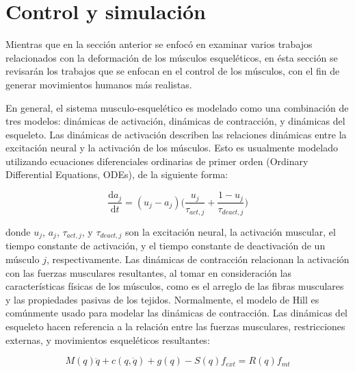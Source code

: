 \section{Control y simulación}

Mientras que en la sección anterior se enfocó en examinar varios trabajos relacionados con la deformación de los músculos esqueléticos, en ésta sección se revisarán los trabajos que se enfocan en el control de los músculos, con el fin de generar movimientos humanos más realistas. 

En general, el sistema musculo-esquelético es modelado como una combinación de tres modelos: dinámicas de activación, dinámicas de contracción, y dinámicas del esqueleto. Las dinámicas de activación describen las relaciones dinámicas entre la excitación neural y la activación de los músculos. Esto es usualmente modelado utilizando ecuaciones diferenciales ordinarias de primer orden (Ordinary Differential Equations, ODEs), de la siguiente forma:

\begin{equation}
	\frac{\mathrm da_j}{\mathrm dt} = (u_j - a_j) \bigg(\frac{u_j}{\tau_{act,j}} + \frac{1 - u_j}{\tau_{deact,j}} \bigg)
\end{equation}

donde $u_j$, $a_j$, $\tau_{act,j}$, y $\tau_{deact,j}$ son la excitación neural, la activación muscular, el tiempo constante de activación, y el tiempo constante de deactivación de un músculo $j$, respectivamente. Las dinámicas de contracción relacionan la activación con las fuerzas musculares resultantes, al tomar en consideración las características físicas de los músculos, como es el arreglo de las fibras musculares y las propiedades pasivas de los tejidos. Normalmente, el modelo de Hill es comúnmente usado para modelar las dinámicas de contracción. Las dinámicas del esqueleto hacen referencia a la relación entre las fuerzas musculares, restricciones externas, y movimientos esqueléticos resultantes:

\begin{equation}
\label{eq:skeletonDynamics}
	M(q)\ddot{q}+c(q,\dot{q})+g(q) - S(q)f_{ext} = R(q)f_{mt}
\end{equation}

